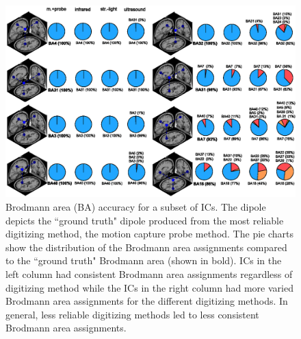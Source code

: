 \documentclass{UCF_ETD}
\begin{document}
\begin{figure}[h!]
    \centering
    \includegraphics{img/result6.eps}
    \caption{Brodmann area (BA) accuracy for a subset of ICs. The dipole depicts the ``ground truth" dipole produced from the most reliable digitizing method, the motion capture probe method. The pie charts show the distribution of the Brodmann area assignments compared to the ``ground truth" Brodmann area (shown in bold). ICs in the left column had consistent Brodmann area assignments regardless of digitizing method while the ICs in the right column had more varied Brodmann area assignments for the different digitizing methods. In general, less reliable digitizing methods led to less consistent Brodmann area assignments.}
    \label{fig:r6}
\end{figure}
\end{document}
